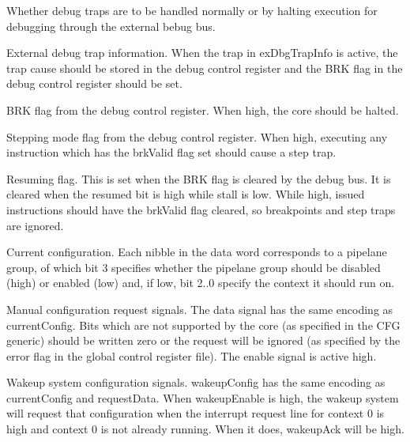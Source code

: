 \ifaceSubGroup{}
Whether debug traps are to be handled normally or by halting execution for 
debugging through the external bebug bus.

\ifaceSubGroup{}
External debug trap information. When the trap in exDbgTrapInfo is active, the 
trap cause should be stored in the debug control register and the BRK flag in 
the debug control register should be set.

\ifaceSubGroup{}
BRK flag from the debug control register. When high, the core should be halted.

\ifaceSubGroup{}
Stepping mode flag from the debug control register. When high, executing any 
instruction which has the brkValid flag set should cause a step trap.

\ifaceSubGroup{}
Resuming flag. This is set when the BRK flag is cleared by the debug bus. It is 
cleared when the resumed bit is high while stall is low. While high, issued 
instructions should have the brkValid flag cleared, so breakpoints and step 
traps are ignored.
    
\ifaceSubGroup{}
Current configuration. Each nibble in the data word corresponds to a pipelane 
group, of which bit 3 specifies whether the pipelane group should be disabled 
(high) or enabled (low) and, if low, bit 2..0 specify the context it should run 
on.

\ifaceSubGroup{}
Manual configuration request signals. The data signal has the same encoding as 
currentConfig. Bits which are not supported by the core (as specified in the CFG 
generic) should be written zero or the request will be ignored (as specified by 
the error flag in the global control register file). The enable signal is active 
high.

\ifaceSubGroup{}
Wakeup system configuration signals. wakeupConfig has the same encoding as
currentConfig and requestData. When wakeupEnable is high, the wakeup system will
request that configuration when the interrupt request line for context 0 is high
and context 0 is not already running. When it does, wakeupAck will be high.

